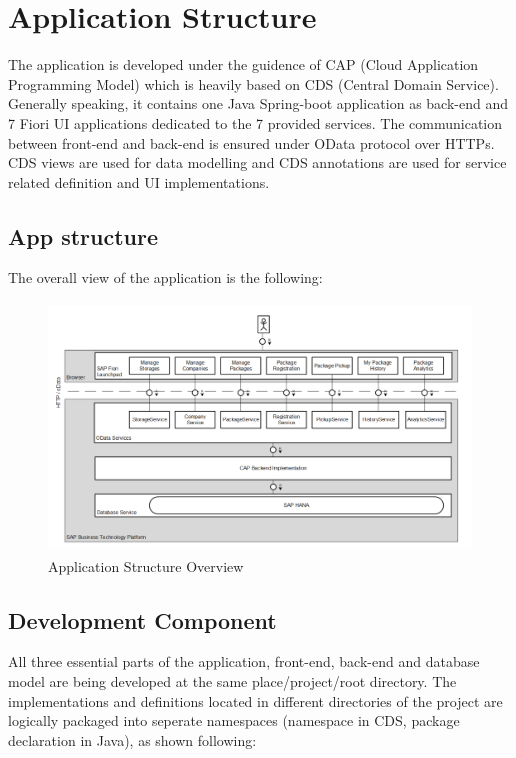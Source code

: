 

\section{Application Structure}

The application is developed under the guidence of CAP (Cloud Application Programming Model) which is heavily based on CDS (Central Domain Service). Generally speaking, it contains one Java Spring-boot application as back-end and 7 Fiori UI applications dedicated to the 7 provided services. The communication between front-end and back-end is ensured under OData protocol over HTTPs. CDS views are used for data modelling and CDS annotations are used for service related definition and UI implementations.

\subsection{App structure}

The overall view of the application is the following:

\begin{figure}[H]
	\centering
	\includegraphics[height=250px]{images/Application_Structure.png}
	\caption{Application Structure Overview}
	\label{fig:appStruct}
\end{figure}

\subsection{Development Component}

All three essential parts of the application, front-end, back-end and database model are being developed at the same place/project/root directory. The implementations and definitions located in different directories of the project are logically packaged into seperate namespaces (namespace in CDS, package declaration in Java), as shown following:

